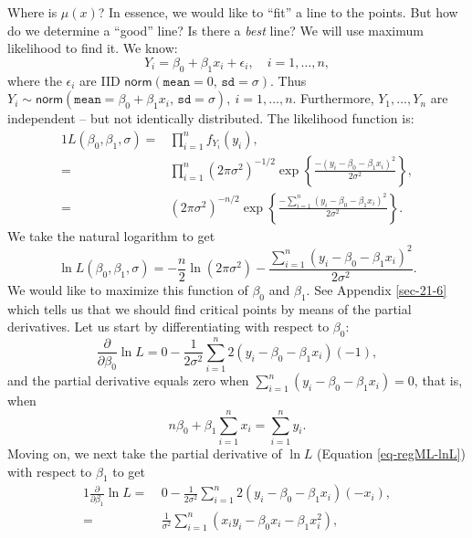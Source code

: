 \documentclass[captions=tableheading]{scrbook}
\begin{document}
Where is \( \mu(x) \)? In essence, we would like to ``fit'' a line to the points. But how do we determine a ``good'' line? Is there a \emph{best} line? We will use maximum likelihood to find it. We know:
\begin{equation}
Y_{i} = \beta_{0} + \beta_{1}x_{i} + \epsilon_{i},\quad i=1,\ldots,n,
\end{equation}
where the \( \epsilon_{i} \) are IID \(\mathsf{norm}(\mathtt{mean}=0,\,\mathtt{sd}=\sigma) \). Thus \( Y_{i}\sim\mathsf{norm}(\mathtt{mean}=\beta_{0}+\beta_{1}x_{i},\,\mathtt{sd}=\sigma),\ i=1,\ldots,n \). Furthermore, \( Y_{1},\ldots,Y_{n} \) are independent -- but not identically distributed. The likelihood function is:
\begin{alignat}{1}
L(\beta_{0},\beta_{1},\sigma)= & \prod_{i=1}^{n}f_{Y_{i}}(y_{i}),\\
= & \prod_{i=1}^{n}(2\pi\sigma^{2})^{-1/2}\exp\left\{ \frac{-(y_{i}-\beta_{0}-\beta_{1}x_{i})^{2}}{2\sigma^{2}}\right\} ,\\
= & (2\pi\sigma^{2})^{-n/2}\exp\left\{ \frac{-\sum_{i=1}^{n}(y_{i}-\beta_{0}-\beta_{1}x_{i})^{2}}{2\sigma^{2}}\right\} .
\end{alignat}
We take the natural logarithm to get
\begin{equation}
\ln L(\beta_{0},\beta_{1},\sigma)=-\frac{n}{2}\ln(2\pi\sigma^{2})-\frac{\sum_{i=1}^{n}(y_{i}-\beta_{0}-\beta_{1}x_{i})^{2}}{2\sigma^{2}}.\label{eq-regML-lnL}
\end{equation}
 We would like to maximize this function of \( \beta_{0} \) and \( \beta_{1} \). See Appendix \ref{sec-21-6} which tells us that we should find critical points by means of the partial derivatives. Let us start by differentiating with respect to \( \beta_{0} \):
\begin{equation}
\frac{\partial}{\partial\beta_{0}}\ln L=0-\frac{1}{2\sigma^{2}}\sum_{i=1}^{n}2(y_{i}-\beta_{0}-\beta_{1}x_{i})(-1),
\end{equation}
and the partial derivative equals zero when \( \sum_{i=1}^{n}(y_{i}-\beta_{0}-\beta_{1}x_{i}) = 0 \), that is, when
\begin{equation}
n \beta_{0} + \beta_{1} \sum_{i=1}^{n} x_{i} = \sum_{i = 1}^{n}y_{i}.\label{eq-regML-a}
\end{equation}
Moving on, we next take the partial derivative of \( \ln L \) (Equation \ref{eq-regML-lnL}) with respect to \( \beta_{1} \) to get
\begin{alignat}{1}
\frac{\partial}{\partial\beta_{1}}\ln L=\  & 0-\frac{1}{2\sigma^{2}}\sum_{i=1}^{n}2(y_{i}-\beta_{0}-\beta_{1}x_{i})(-x_{i}),\\
= & \frac{1}{\sigma^{2}}\sum_{i=1}^{n}\left(x_{i}y_{i}-\beta_{0}x_{i}-\beta_{1}x_{i}^{2}\right),
\end{alignat}
\end{document}
